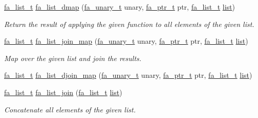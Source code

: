 \begin{DoxyCompactItemize}
\hyperlink{group___fa_list_ga35ecb12ab934ded0cce0bcf28e3bc5d2}{fa\-\_\-list\-\_\-t} \hyperlink{group___fa_list_ga903153fb39216e230e74d1c019def2ca}{fa\-\_\-list\-\_\-dmap} (\hyperlink{group___fa_gaaafae8ab9ebae9019133108e56d2d4d1}{fa\-\_\-unary\-\_\-t} unary, \hyperlink{group___fa_ga915ddeae99ad7568b273d2b876425197}{fa\-\_\-ptr\-\_\-t} ptr, \hyperlink{group___fa_list_ga35ecb12ab934ded0cce0bcf28e3bc5d2}{fa\-\_\-list\-\_\-t} \hyperlink{literals_8h_a4ddd63dfcfec2b4d5741a56aa6003c76}{list})
\begin{DoxyCompactList}\small\item\em Return the result of applying the given function to all elements of the given list. \end{DoxyCompactList}\item 
\hyperlink{group___fa_list_ga35ecb12ab934ded0cce0bcf28e3bc5d2}{fa\-\_\-list\-\_\-t} \hyperlink{group___fa_list_ga310dbd6b08a10265974cf514072f700b}{fa\-\_\-list\-\_\-join\-\_\-map} (\hyperlink{group___fa_gaaafae8ab9ebae9019133108e56d2d4d1}{fa\-\_\-unary\-\_\-t} unary, \hyperlink{group___fa_ga915ddeae99ad7568b273d2b876425197}{fa\-\_\-ptr\-\_\-t} ptr, \hyperlink{group___fa_list_ga35ecb12ab934ded0cce0bcf28e3bc5d2}{fa\-\_\-list\-\_\-t} \hyperlink{literals_8h_a4ddd63dfcfec2b4d5741a56aa6003c76}{list})
\begin{DoxyCompactList}\small\item\em Map over the given list and join the results. \end{DoxyCompactList}\item 
\hyperlink{group___fa_list_ga35ecb12ab934ded0cce0bcf28e3bc5d2}{fa\-\_\-list\-\_\-t} \hyperlink{group___fa_list_ga655f545f1e7f2866d50fc466af262cdd}{fa\-\_\-list\-\_\-djoin\-\_\-map} (\hyperlink{group___fa_gaaafae8ab9ebae9019133108e56d2d4d1}{fa\-\_\-unary\-\_\-t} unary, \hyperlink{group___fa_ga915ddeae99ad7568b273d2b876425197}{fa\-\_\-ptr\-\_\-t} ptr, \hyperlink{group___fa_list_ga35ecb12ab934ded0cce0bcf28e3bc5d2}{fa\-\_\-list\-\_\-t} \hyperlink{literals_8h_a4ddd63dfcfec2b4d5741a56aa6003c76}{list})
\item 
\hyperlink{group___fa_list_ga35ecb12ab934ded0cce0bcf28e3bc5d2}{fa\-\_\-list\-\_\-t} \hyperlink{group___fa_list_ga15bad8434d5b0f2361dbffe761da1c02}{fa\-\_\-list\-\_\-join} (\hyperlink{group___fa_list_ga35ecb12ab934ded0cce0bcf28e3bc5d2}{fa\-\_\-list\-\_\-t} \hyperlink{literals_8h_a4ddd63dfcfec2b4d5741a56aa6003c76}{list})
\begin{DoxyCompactList}\small\item\em Concatenate all elements of the given list. \end{DoxyCompactList}\item 

\end{DoxyCompactItemize}
